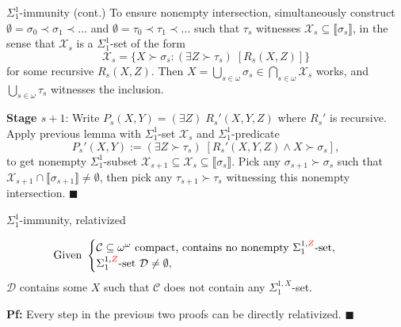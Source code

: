 \begin{frame}{$\Sigma_1^{1}$-immunity (cont.)}
  To ensure nonempty intersection, simultaneously construct
  $\emptyset= \sigma_0\prec\sigma_1\prec\ldots$ and $\emptyset=
  \tau_0\prec\tau_1\prec\ldots$ such that $\tau_s$ witnesses $\mathcal{X}_s
  \subseteq \llbracket\sigma_s\rrbracket$, in the sense that
  $\mathcal{X}_s$ is a $\Sigma^1_1$-set of the form
  \[\mathcal{X}_s =\{X\succ\sigma_s: (\exists Z\succ\tau_s)\;
  [R_s(X,Z)]\}\]
  for some recursive $R_s(X,Z)$. Then $X=\bigcup_{s\in\omega} \sigma_s \in
  \bigcap_{s\in\omega} \mathcal{X}_s$ works, and
  $\bigcup_{s\in\omega} \tau_s$ witnesses the inclusion.

  \vspace{1.5em}
  \textbf{Stage $s+1$}: Write $P_s(X,Y) =(\exists Z)\; R_s'(X,Y,Z)$ where
  $R_s'$ is recursive. Apply previous lemma with $\Sigma^1_1$-set
  $\mathcal{X}_s$ and $\Sigma^1_1$-predicate 
  \[P_s'(X,Y) :=(\exists Z\succ\tau_s)\; [R_s'(X,Y,Z) \wedge
  X\succ\sigma_s],\]
  to get nonempty $\Sigma^1_1$-subset $\mathcal{X}_{s+1} \subseteq
  \mathcal{X}_s \subseteq \llbracket\sigma_s\rrbracket$. Pick any
  $\sigma_{s+1}\succ\sigma_s$ such that $\mathcal{X}_{s+1}\cap
  \llbracket\sigma_{s+1}\rrbracket \neq\emptyset$, then pick any
  $\tau_{s+1}\succ\tau_s$ witnessing this nonempty intersection.
  $\blacksquare$
\end{frame}

\begin{frame}{$\Sigma_1^{1}$-immunity, relativized}
  \begin{coro*}
    \begin{align*}
      \text{Given } &\begin{cases}
        \mathcal{C}\subseteq\omega^\omega \text{ compact, contains
        no nonempty } \Sigma^{1,\textcolor{red}{Z}}_{1}\text{-set},\\
        \Sigma^{1,\textcolor{red}{Z}}_{1}\text{-set }
        \mathcal{D}\neq\emptyset,
      \end{cases}
    \end{align*}
    $\mathcal{D}$ contains some $X$ such that $\mathcal{C}$ does not
    contain any $\Sigma_1^{1,X}$-set.
  \end{coro*}

  \vspace{2em}
  \textbf{Pf:} Every step in the previous two proofs can be directly
  relativized.
  $\blacksquare$
\end{frame}
